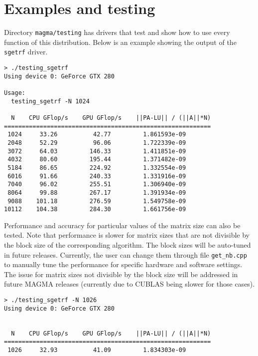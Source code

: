 \documentclass[10pt]{book}
\begin{document}
\newpage

\section{Examples and testing}\label{testing}
Directory {\tt magma/testing} has drivers that test and show how
to use every function of this distribution. Below is an example
showing the output of the {\tt sgetrf} driver.

\begin{verbatim}
> ./testing_sgetrf
Using device 0: GeForce GTX 280

Usage: 
  testing_sgetrf -N 1024

  N    CPU GFlop/s    GPU GFlop/s    ||PA-LU|| / (||A||*N)
==========================================================
 1024     33.26          42.77         1.861593e-09
 2048     52.29          96.06         1.722339e-09
 3072     64.03         146.33         1.411851e-09
 4032     80.60         195.44         1.371482e-09
 5184     86.65         224.92         1.332554e-09
 6016     91.66         240.33         1.331916e-09
 7040     96.02         255.51         1.306940e-09
 8064     99.88         267.17         1.391934e-09
 9088    101.18         276.59         1.549758e-09
10112    104.38         284.30         1.661756e-09

\end{verbatim}

Performance and accuracy for particular values of the matrix
size can also be tested. Note that performance is slower
for matrix sizes that are not divisible by the block size of the 
corresponding algorithm. The block sizes will be auto-tuned
in future releases. Currently, the user can change them through
file {\tt get\_nb.cpp} to manually tune the performance for 
specific hardware and software settings. 
The issue for matrix sizes not divisible by the block size 
will be addressed in future MAGMA releases (currently due
to CUBLAS being slower for those cases).

\begin{verbatim}
> ./testing_sgetrf -N 1026
Using device 0: GeForce GTX 280


  N    CPU GFlop/s    GPU GFlop/s    ||PA-LU|| / (||A||*N)
==========================================================
 1026     32.93          41.09         1.834303e-09
\end{verbatim}
\end{document}
